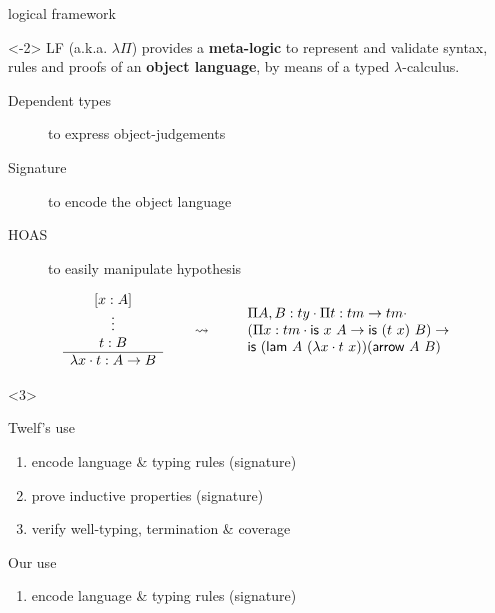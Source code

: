 \documentclass[ignorenonframetext,red]{beamer}
\begin{document}
\begin{frame}{ logical framework }
  \begin{onlyenv}<-2>
    LF  (a.k.a. $\lambda\Pi$) provides a {\bf
      meta-logic} to represent and validate syntax, rules and proofs
    of an \textbf{object language}, by means of a typed
    $\lambda$-calculus.

    \begin{description}
    \item[Dependent types] to express object-judgements
    \item[Signature] to encode the object language
    \item[HOAS] to easily manipulate hypothesis
    \end{description}
    \pause
    \begin{example}
      \scriptsize
      \[
      \begin{array}{c}
        [x:A]\\
        \vdots\\
        t : B \\\hline
        \ulam x t : A\to B
      \end{array}
      \qquad\leadsto\qquad
      \begin{array}{l}
        \prd {A,B}{ty} \prd t {tm\to tm} \\
        (\prd x {tm} {\textsf{is}\ x\ A} \to \textsf{is}\ (t\ x)\ B) \to \\
        \textsf{is}\ (\textsf{lam}\ A\ (\ulam x t\ x))(\textsf{arrow}\ A\ B)
      \end{array}
      \]
    \end{example}
  \end{onlyenv}
  \begin{onlyenv}<3>
    \begin{block}{\textsf{Twelf}'s use}
      \begin{enumerate}
      \item encode language \& typing rules (signature)
      \item prove inductive properties (signature)
      \item verify well-typing, termination \& coverage
      \end{enumerate}
    \end{block}
    \begin{block}{Our use}
      \begin{enumerate}
      \item encode language \& typing rules (signature)

\end{enumerate}
\end{block}
\end{onlyenv}
\end{frame}
\end{document}

